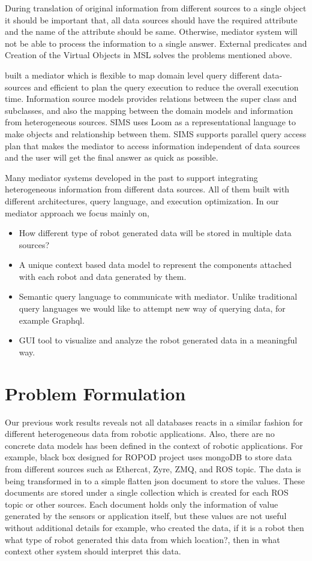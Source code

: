 \documentclass[12pt]{article}
\begin{document}
During translation of original information from different sources to a single object it should be important that, all data sources should have the required attribute and the name of the attribute should be same. Otherwise, mediator system will not be able to process the information to a single answer.  External predicates and Creation of the Virtual Objects in MSL solves the problems mentioned above.

\citet{arens1996query} built a mediator which is flexible to map domain level query different data-sources and efficient to plan the query execution to reduce the overall execution time. Information source models provides relations between the super class and subclasses, and also the mapping between the domain models and information from heterogeneous sources. SIMS uses Loom as a representational language to make objects and relationship between them. SIMS supports parallel query access plan that makes the mediator to access information independent of data sources and the user will get the final answer as quick as possible.

Many mediator systems developed in the past to support integrating heterogeneous information from different data sources. All of them built with different architectures, query language, and execution optimization. In our mediator approach we focus mainly on,
\begin{itemize}
	\item How different type of robot generated data will be stored in multiple data sources?
	\item A unique context based data model to represent the components attached with each robot and data generated by them.
	\item Semantic query language to communicate with mediator. Unlike traditional query languages we would like to attempt new way of querying data, for example Graphql.
	\item GUI tool to visualize and analyze the robot generated data in a meaningful way.
\end{itemize} 

 

\section{Problem Formulation}

Our previous work results reveals not all databases reacts in a similar fashion for different heterogeneous data from robotic applications. Also, there are no concrete data models has been defined in the context of robotic applications. For example, black box designed for ROPOD project uses mongoDB to store data from different sources such as Ethercat, Zyre, ZMQ, and ROS topic. The data is being transformed in to a simple flatten json document to store the values. These documents are stored under a single collection which is created for each ROS topic or other sources. Each document holds only the information of value generated by the sensors or application itself, but these values are not useful without additional details for example, who created the data, if it is a robot then what type of robot generated this data from which location?, then in what context other system should interpret this data.
\end{document}
